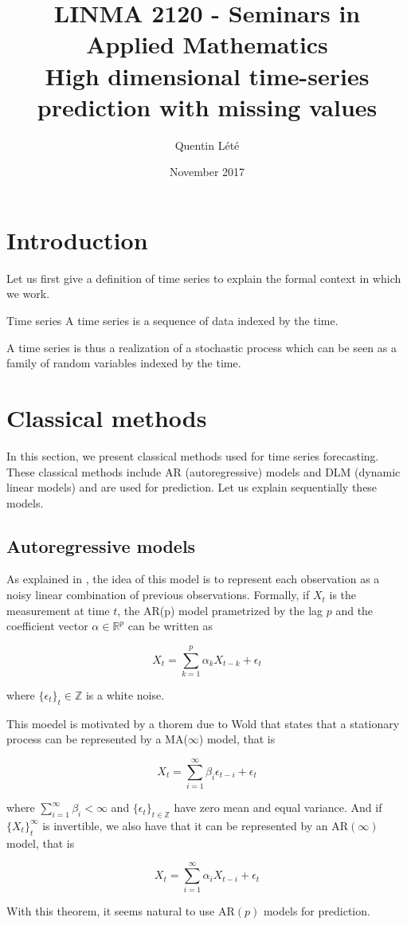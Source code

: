 \documentclass{article}
\title{LINMA 2120 - Seminars in Applied Mathematics \\
        High dimensional time-series prediction with missing values}
\author{Quentin Lété}
\date{November 2017}
\begin{document}
\maketitle

\section{Introduction}

Let us first give a definition of time series to explain the formal context in which we work.

\theoremstyle{definition}
\begin{definition}{Time series}
A time series is a sequence of data indexed by the time.
\end{definition}

A time series is thus a realization of a stochastic process which can be seen as a family of random variables indexed by the time.

\section*{Classical methods}
In this section, we present classical methods used for time series forecasting.
These classical methods include AR (autoregressive) models and DLM (dynamic linear models) and are used for prediction.
Let us explain sequentially these models.

\subsection*{Autoregressive models}
As explained in \cite{pmlr-v37-anava15}, the idea of this model is to represent each observation as a noisy linear combination of previous observations.
Formally, if $X_t$ is the measurement at time $t$, the AR(p) model prametrized by the lag $p$ and the coefficient vector $\alpha \in \mathbb{R}^p$ can be written as

$$X_t = \sum_{k=1}^p \alpha_k X_{t-k} + \epsilon_t$$

where $\{ \epsilon_t \}_t \in \mathbb{Z}$ is a white noise.

This moedel is motivated by a thorem due to Wold that states that a stationary process can be represented by a MA($\infty$) model, that is

$$X_t = \sum_{i=1}^{\infty} \beta_i \epsilon_{t-i} + \epsilon_t$$

where $\sum_{i=1}^\infty \beta_i < \infty$ and $\{\epsilon_t\}_{t \in \mathbb{Z}}$ have zero mean and equal variance. And if $\{ X_t \}_t^\infty$ is invertible, we also have that it can be represented by an AR$(\infty)$ model, that is

$$X_t = \sum_{i=1}^{\infty} \alpha_i X_{t-i} + \epsilon_t$$

With this theorem, it seems natural to use AR$(p)$ models for prediction.



\end{document}
